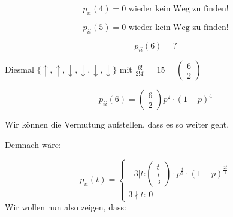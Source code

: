 \begin{uebsp}

\begin{equation*}
p_{\mathit{ii}}(4)=0\text{  wieder kein Weg zu finden!}
\end{equation*}


\begin{equation*}
p_{\mathit{ii}}(5)=0\text{  wieder kein Weg zu finden!}
\end{equation*}


\begin{equation*}
p_{\mathit{ii}}(6)=?
\end{equation*}


{
Diesmal  $\{\uparrow ,\uparrow ,\downarrow ,\downarrow ,\downarrow
,\downarrow \}$ mit 
$\frac{6!}{2!4!}=15=\left(\begin{matrix}6\\2\end{matrix}\right)$ }



\begin{equation*}
p_{\mathit{ii}}(6)=\left(\begin{matrix}6\\2\end{matrix}\right)p^{2}\cdot
(1-p)^{4}
\end{equation*}


{
Wir k\"onnen die Vermutung aufstellen, dass es so weiter geht. }



{
Demnach w\"are:}



\begin{equation*}
p_{\mathit{ii}}(t)=\left\{\begin{matrix}\text{ 
}3|t\text{:}\left(\begin{matrix}t\\\frac{t}{3}\end{matrix}\right)\cdot
p^{\frac{t}{3}}\cdot (1-p)^{\frac{2t}{3}}\\3\nmid t\text{:  
}0\end{matrix}\right.
\end{equation*}
{
Wir wollen nun also zeigen, dass:}




\end{uebsp}
